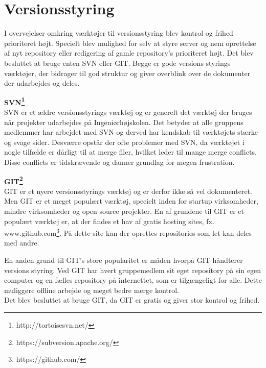 \section{Versionsstyring}
I overvejelser omkring værktøjer til versionsstyring blev kontrol og frihed prioriteret højt. Specielt blev mulighed for selv at styre server og nem oprettelse af nyt repository eller redigering af gamle repository's prioriteret højt.
Det blev besluttet at bruge enten SVN eller GIT. Begge er gode versions styrings værktøjer, der bidrager til god struktur og giver overblink over de dokumenter der udarbejdes og deles. 


\textbf{SVN\footnote{http://tortoisesvn.net/}} \\
SVN er et ældre versionsstyrings værktøj og er generelt det værktøj der bruges når projekter udarbejdes på Ingeniørhøjskolen. Det betyder at alle gruppens medlemmer har arbejdet med SVN og derved har kendskab til værktøjets stærke og svage sider. 
Desværre opstår der ofte problemer med SVN, da værktøjet i nogle tilfælde er dårligt til at merge filer, hvilket leder til mange merge conflicts. Disse conflicts er tidskrævende og danner grundlag for megen frustration. 

\textbf{GIT\footnote{https://subversion.apache.org/}} \\
GIT er et nyere versionsstyrings værktøj og er derfor ikke så vel dokumenteret.
Men GIT er et meget populært værktøj, specielt inden for startup virksomheder, mindre virksomheder og open source projekter. 
En af grundene til GIT er et populært værktøj er, at der findes et hav af gratis hosting sites, fx. www.github.com\footnote{https://github.com/}. På dette site kan der oprettes repositories som let kan deles med andre.

En anden grund til GIT's store popularitet er måden hvorpå GIT håndterer versions styring. Ved GIT har hvert gruppemedlem sit eget repository på sin egen computer og en fælles repository på internettet, som er tilgængeligt for alle. Dette muliggøre offline arbejde og meget bedre merge kontrol. \\

Det blev besluttet at bruge GIT, da GIT er gratis og giver stor kontrol og frihed.